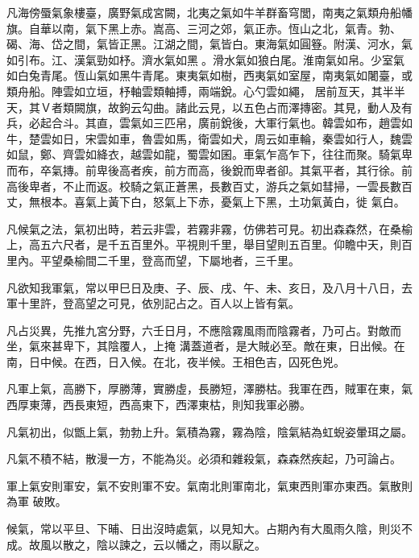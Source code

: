 \begin{pinyinscope}
 凡海傍蜃氣象樓臺，廣野氣成宮闕，北夷之氣如牛羊群畜穹閭，南夷之氣類舟船幡旗。自華以南，氣下黑上赤。嵩高、三河之郊，氣正赤。恆山之北，氣青。勃、碣、海、岱之間，氣皆正黑。江湖之間，氣皆白。東海氣如圓簦。附漢、河水，氣如引布。江、漢氣勁如杼。濟水氣如黑。滑水氣如狼白尾。淮南氣如帛。少室氣如白兔青尾。恆山氣如黑牛青尾。東夷氣如樹，西夷氣如室屋，南夷氣如闍臺，或類舟船。陣雲如立垣，杼軸雲類軸搏，兩端銳。心勺雲如繩，
 居前亙天，其半半天，其Ｖ者類闕旗，故鉤云勾曲。諸此云見，以五色占而澤摶密。其見，動人及有兵，必起合斗。其直，雲氣如三匹帛，廣前銳後，大軍行氣也。韓雲如布，趙雲如牛，楚雲如日，宋雲如車，魯雲如馬，衛雲如犬，周云如車輪，秦雲如行人，魏雲如鼠，鄭、齊雲如絳衣，越雲如龍，蜀雲如囷。車氣乍高乍下，往往而聚。騎氣卑而布，卒氣摶。前卑後高者疾，前方而高，後銳而卑者卻。其氣平者，其行徐。前高後卑者，不止而返。校騎之氣正蒼黑，長數百丈，游兵之氣如彗掃，一雲長數百丈，無根本。喜氣上黃下白，怒氣上下赤，憂氣上下黑，土功氣黃白，徙
 氣白。



 凡候氣之法，氣初出時，若云非雲，若霧非霧，仿佛若可見。初出森森然，在桑榆上，高五六尺者，是千五百里外。平視則千里，舉目望則五百里。仰瞻中天，則百里內。平望桑榆間二千里，登高而望，下屬地者，三千里。



 凡欲知我軍氣，常以甲巳日及庚、子、辰、戌、午、未、亥日，及八月十八日，去軍十里許，登高望之可見，依別記占之。百人以上皆有氣。



 凡占災異，先推九宮分野，六壬日月，不應陰霧風雨而陰霧者，乃可占。對敵而坐，氣來甚卑下，其陰覆人，上掩
 溝蓋道者，是大賊必至。敵在東，日出候。在南，日中候。在西，日入候。在北，夜半候。王相色吉，囚死色兇。



 凡軍上氣，高勝下，厚勝薄，實勝虛，長勝短，澤勝枯。我軍在西，賊軍在東，氣西厚東薄，西長東短，西高東下，西澤東枯，則知我軍必勝。



 凡氣初出，似甑上氣，勃勃上升。氣積為霧，霧為陰，陰氣結為虹蜺姿暈珥之屬。



 凡氣不積不結，散漫一方，不能為災。必須和雜殺氣，森森然疾起，乃可論占。



 軍上氣安則軍安，氣不安則軍不安。氣南北則軍南北，氣東西則軍亦東西。氣散則為軍
 破敗。



 候氣，常以平旦、下晡、日出沒時處氣，以見知大。占期內有大風雨久陰，則災不成。故風以散之，陰以諫之，云以幡之，雨以厭之。




\end{pinyinscope}
